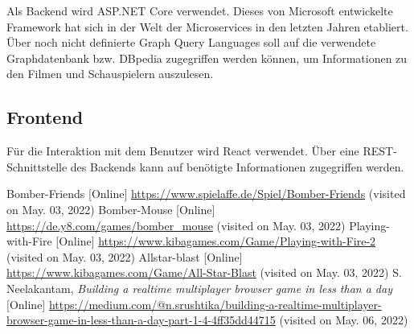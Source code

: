 \documentclass[conference]{IEEEtran}
\begin{document}
Als Backend wird ASP.NET Core verwendet. Dieses von Microsoft entwickelte Framework hat sich in der Welt der Microservices in den letzten Jahren etabliert. Über noch nicht definierte Graph Query Languages soll auf die verwendete Graphdatenbank bzw. DBpedia zugegriffen werden können, um Informationen zu den Filmen und Schauspielern auszulesen.

\subsection*{Frontend}

Für die Interaktion mit dem Benutzer wird React verwendet. Über eine REST-Schnittstelle des Backends kann auf benötigte Informationen zugegriffen werden.


\nocite{space-invaders}
\begin{thebibliography}{0}
	Bomber-Friends [Online] \url{https://www.spielaffe.de/Spiel/Bomber-Friends} (visited on May. 03, 2022)
	Bomber-Mouse [Online] \url{https://de.y8.com/games/bomber_mouse} (visited on May. 03, 2022)
	Playing-with-Fire [Online] \url{https://www.kibagames.com/Game/Playing-with-Fire-2 } (visited on May. 03, 2022)
	Allstar-blast [Online] \url{https://www.kibagames.com/Game/All-Star-Blast} (visited on May. 03, 2022)
	S. Neelakantam,	\textit{Building a realtime multiplayer browser game in less than a day} [Online] \url{https://medium.com/@n.srushtika/building-a-realtime-multiplayer-browser-game-in-less-than-a-day-part-1-4-4ff35dd44715} (visited on May. 06, 2022)

\end{thebibliography}
\vspace{12pt}
\end{document}

